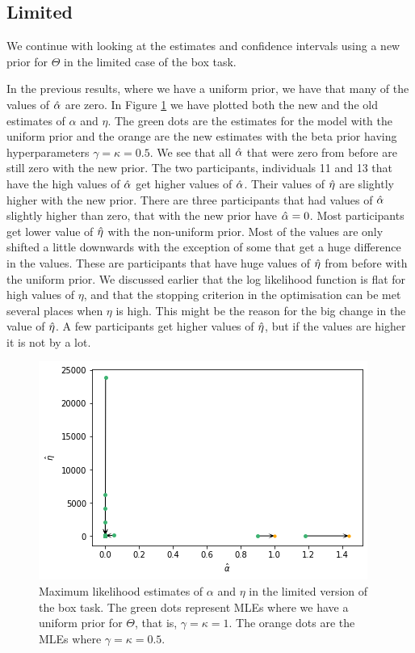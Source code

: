 
\subsection{Limited}
We continue with looking at the estimates and confidence intervals using a new prior for $\Theta$ in the limited case of the box task. 

In the previous results, where we have a uniform prior, we have that many of the values of $\hat{\alpha}$ are zero. In Figure \ref{fig:sensitivity_mles_lim_a_e} we have plotted both the new and the old estimates of $\alpha$ and $\eta$. The green dots are the estimates for the model with the uniform prior and the orange are the new estimates with the beta prior having hyperparameters $\gamma=\kappa=0.5$. 
We see that all $\hat{\alpha}$ that were zero from before are still zero with the new prior. The two participants, individuals 11 and 13 that have the high values of $\hat{\alpha}$ get higher values of $\hat{\alpha}$. Their values of $\hat{\eta}$ are slightly higher with the new prior. 
There are three participants that had values of $\hat{\alpha}$ slightly higher than zero, that with the new prior have $\hat{\alpha}=0$. 
Most participants get lower value of $\hat{\eta}$ with the non-uniform prior. Most of the values are only shifted a little downwards with the exception of some that get a huge difference in the values. These are participants that have huge values of $\hat{\eta}$ from before with the uniform prior. We discussed earlier that the log likelihood function is flat for high values of $\eta$, and that the stopping criterion in the optimisation can be met several places when $\eta$ is high. This might be the reason for the big change in the value of $\hat{\eta}$. 
A few participants get higher values of $\hat{\eta}$, but if the values are higher it is not by a lot. 
\begin{figure}
    \centering
    \includegraphics[scale=0.8]{pictures/Sensitivity/mles_lim_a_e.png}
    \caption[MLEs of $\alpha$ and $\eta$ for prior with $\gamma=\kappa=1$ and $\gamma=\kappa=0.5$, limited]{
    Maximum likelihood estimates of $\alpha$ and $\eta$ in the limited version of the box task. The green dots represent MLEs where we have a uniform prior for $\Theta$, that is, $\gamma=\kappa=1$. The orange dots are the MLEs where $\gamma=\kappa=0.5$.}
    \label{fig:sensitivity_mles_lim_a_e}
\end{figure}

